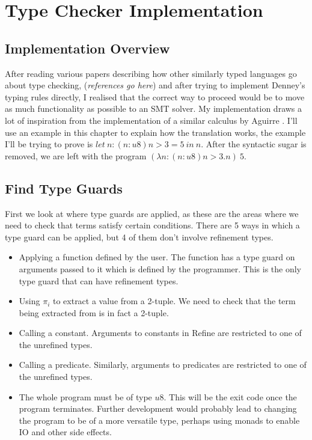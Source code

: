 \section{Type Checker Implementation}

\subsection{Implementation Overview}

After reading various papers describing how other similarly typed languages go about type checking,
(\textit{references go here})
and after trying to implement Denney's typing rules directly, I realised that the correct way to
proceed would be to move as much functionality as possible to an SMT solver.
My implementation draws a lot of inspiration from the implementation of a similar calculus by
Aguirre \cite{aguirre16}.
I'll use an example in this chapter to explain how the translation works, the example I'll be
trying to prove is $let\ n: (n:u8) n > 3 = 5\ in\ n$.
After the syntactic sugar is removed, we are left with the program
$(\lambda n: (n:u8) n > 3 . n)\ 5$.

\subsection{Find Type Guards}

First we look at where type guards are applied, as these are the areas where we need to check
that terms satisfy certain conditions.
There are 5 ways in which a type guard can be applied, but 4 of them don't involve refinement types.

\begin{itemize}
    \item Applying a function defined by the user.
    The function has a type guard on arguments passed to it which is defined by the programmer.
    This is the only type guard that can have refinement types.
    \item Using $\pi_i$ to extract a value from a 2-tuple.
    We need to check that the term being extracted from is in fact a 2-tuple.
    \item Calling a constant.
    Arguments to constants in Refine are restricted to one of the unrefined types.
    \item Calling a predicate.
    Similarly, arguments to predicates are restricted to one of the unrefined types.
    \item The whole program must be of type $u8$.
    This will be the exit code once the program terminates.
    Further development would probably lead to changing the program to be of a more versatile type,
    perhaps using monads to enable IO and other side effects.
\end{itemize}

